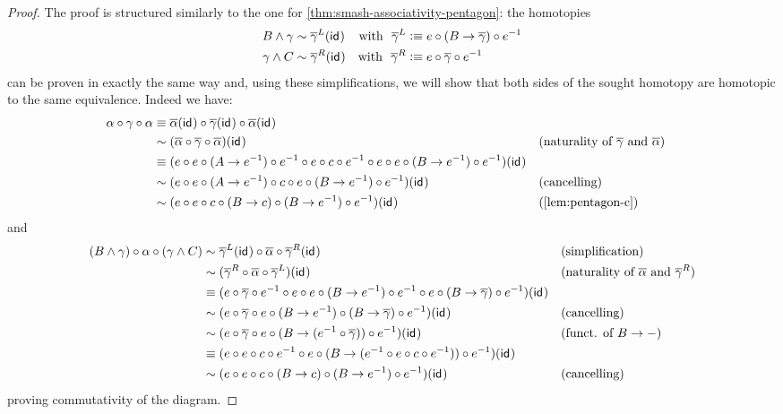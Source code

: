 \documentclass{article}
\renewcommand{\smash}{\wedge}
\renewcommand{\o}{\ensuremath{\circ}}
\newcommand{\sy}{^{-1}}
\newcommand{\alphabar}{\overline{\alpha}}
\newcommand{\gammabar}{\overline{\gamma}}
\begin{document}
\begin{proof}
	The proof is structured similarly to the one for \autoref{thm:smash-associativity-pentagon}: the homotopies
	\begin{align*}
	B \smash \gamma &\sim \gammabar^L(\idfunc) &\text{with\ \ } \gammabar^L &\defeq e \o (B \to \gammabar) \o e\sy\\
	\gamma \smash C &\sim \gammabar^R(\idfunc) &\text{with\ \ } \gammabar^R &\defeq e \o \gammabar \o e\sy
	\end{align*}		
	can be proven in exactly the same way and, using these simplifications, we will show that both sides of the sought homotopy are homotopic to the same equivalence. Indeed we have:
	\begin{align*}
		\alpha \o \gamma \o \alpha
		&\judgeq \alphabar(\idfunc) \o \gammabar(\idfunc) \o \alphabar(\idfunc)\\
		&\sim (\alphabar \o \gammabar \o \alphabar)(\idfunc) &&\text{(naturality of $\gammabar$ and $\alphabar$)}\\
		&\judgeq (e \o e \o (A \to e\sy) \o e\sy \o e \o c \o e\sy \o e \o e \o (B \to e\sy) \o e\sy)(\idfunc)\\
		&\sim (e \o e \o (A \to e\sy) \o c \o e \o (B \to e\sy) \o e\sy)(\idfunc) &&\text{(cancelling)}\\
		&\sim (e \o e \o c \o (B \to c) \o (B \to e\sy) \o e\sy)(\idfunc) &&\text{(\autoref{lem:pentagon-c})}
	\end{align*}
	and
	\begin{align*}
		(B \smash \gamma) \o \alpha \o (\gamma \smash C)
		&\sim \gammabar^L(\idfunc) \o \alphabar \o \gammabar^R(\idfunc) &&\text{(simplification)}\\
		&\sim (\gammabar^R \o \alphabar \o \gammabar^L)(\idfunc) &&\text{(naturality of $\alphabar$ and $\gammabar^R$)}\\
		&\judgeq (e \o \gammabar \o e\sy \o e \o e \o (B \to e\sy) \o e\sy \o e \o (B \to \gammabar) \o e\sy)(\idfunc)\\
		&\sim (e \o \gammabar \o e \o (B \to e\sy) \o (B \to \gammabar) \o e\sy)(\idfunc) &&\text{(cancelling)}\\
		&\sim (e \o \gammabar \o e \o (B \to (e\sy \o \gammabar)) \o e\sy)(\idfunc) &&\text{(funct. of $B \to -$)}\\
		&\judgeq (e \o e \o c \o e\sy \o e \o (B \to (e\sy \o e \o c \o e\sy)) \o e\sy)(\idfunc)\\
		&\sim (e \o e \o c \o (B \to c) \o (B \to e\sy) \o e\sy)(\idfunc) &&\text{(cancelling)}
	\end{align*}
	proving commutativity of the diagram.
\end{proof}
\end{document}
